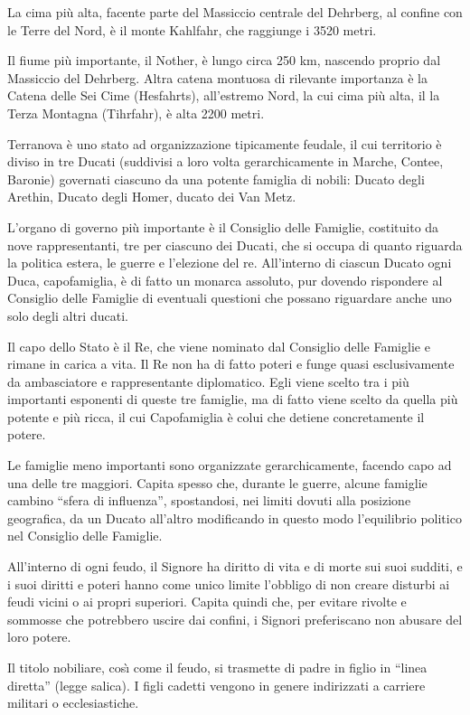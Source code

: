 La cima pi\`u alta, facente parte del Massiccio centrale del Dehrberg,
al confine con le Terre del Nord, \`e il monte Kahlfahr, che raggiunge
i 3520 metri. 

Il fiume pi\`u importante, il Nother, \`e lungo circa 250 km, nascendo
proprio dal Massiccio del Dehrberg. Altra catena montuosa di rilevante
importanza \`e la Catena delle Sei Cime (Hesfahrts), all'estremo Nord,
la cui cima pi\`u alta, il la Terza Montagna (Tihrfahr), \`e alta 2200
metri.

\Politica Terranova \`e uno stato ad organizzazione tipicamente
feudale, il cui territorio \`e diviso in tre Ducati (suddivisi a loro
volta gerarchicamente in Marche, Contee, Baronie) governati ciascuno
da una potente famiglia di nobili: Ducato degli Arethin, Ducato degli
Homer, ducato dei Van Metz.

L'organo di governo pi\`u importante \`e il Consiglio delle Famiglie,
costituito da nove rappresentanti, tre per ciascuno dei Ducati, che si
occupa di quanto riguarda la politica estera, le guerre e l'elezione
del re. All'interno di ciascun Ducato ogni Duca, capofamiglia, \`e di
fatto un monarca assoluto, pur dovendo rispondere al Consiglio delle
Famiglie di eventuali questioni che possano riguardare anche uno solo
degli altri ducati.

Il capo dello Stato \`e il Re, che viene nominato dal Consiglio
delle Famiglie e rimane in carica a vita. Il Re non ha di fatto poteri
e funge quasi esclusivamente da ambasciatore e rappresentante
diplomatico. Egli viene scelto tra i pi\`u importanti esponenti di
queste tre famiglie, ma di fatto viene scelto da quella pi\`u
potente e pi\`u ricca, il cui Capofamiglia \`e colui che detiene
concretamente il potere.

Le famiglie meno importanti sono organizzate gerarchicamente,
facendo capo ad una delle tre maggiori. Capita spesso che, durante le
guerre, alcune famiglie cambino ``sfera di influenza'', spostandosi,
nei limiti dovuti alla posizione geografica, da un Ducato all'altro
modificando in questo modo l'equilibrio politico nel Consiglio delle
Famiglie. 

All'interno di ogni feudo, il Signore ha diritto di vita e di morte
sui suoi sudditi, e i suoi diritti e poteri hanno come unico limite
l'obbligo di non creare disturbi ai feudi vicini o ai propri
superiori. Capita quindi che, per evitare rivolte e sommosse che
potrebbero uscire dai confini, i Signori preferiscano non abusare del
loro potere.


Il titolo nobiliare, cos\`{\i} come il feudo, si trasmette di padre in
figlio in ``linea diretta'' (legge salica). I figli cadetti vengono in
genere indirizzati a carriere militari o ecclesiastiche.

